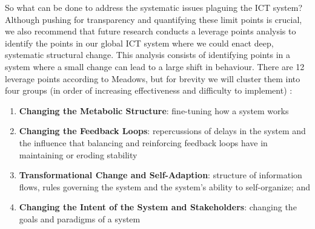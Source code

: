 \documentclass{article}
\begin{document}
So what can be done to address the systematic issues plaguing the ICT system? Although pushing for transparency and quantifying these limit points is crucial, we also recommend that future research conducts a leverage points analysis \cite{meadows2008thinking} to identify the points in our global ICT system where we could enact deep, systematic structural change. This analysis consists of identifying points in a system where a small change can lead to a large shift in behaviour. There are 12 leverage points according to Meadows, but for brevity we will cluster them into four groups (in order of increasing effectiveness and difficulty to implement) \cite{penzenstadler2018software}: 
\begin{enumerate}
    \item \textbf{Changing the Metabolic Structure}: fine-tuning how a system works
    \item \textbf{Changing the Feedback Loops}: repercussions of delays in the system and the influence that balancing and reinforcing feedback loops have in maintaining or eroding stability
    \item \textbf{Transformational Change and Self-Adaption}: structure of information flows, rules governing the system and the system's ability to self-organize; and
    \item \textbf{Changing the Intent of the System and Stakeholders}: changing the goals and paradigms of a system
\end{enumerate}
\end{document}
